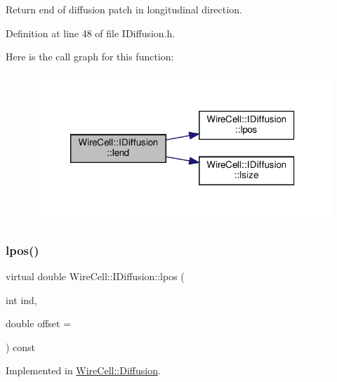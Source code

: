 Return end of diffusion patch in longitudinal direction. 



Definition at line 48 of file I\+Diffusion.\+h.

Here is the call graph for this function\+:
\nopagebreak
\begin{figure}[H]
\begin{center}
\leavevmode
\includegraphics[width=320pt]{class_wire_cell_1_1_i_diffusion_a1016b2629bf19ceb69815200d5f1480f_cgraph}
\end{center}
\end{figure}
\mbox{\label{class_wire_cell_1_1_i_diffusion_a6e85228ca6d4b6848bb8f80a1018a2aa}} 
\subsubsection{\texorpdfstring{lpos()}{lpos()}}
{\footnotesize\ttfamily virtual double Wire\+Cell\+::\+I\+Diffusion\+::lpos (\begin{DoxyParamCaption}\item[{int}]{ind,  }\item[{double}]{offset = {} }\end{DoxyParamCaption}) const\hspace{0.3cm}{\ttfamily [pure virtual]}}



Implemented in \hyperlink{class_wire_cell_1_1_diffusion_a406a933c156b668dc25555e4aa851567}{Wire\+Cell\+::\+Diffusion}.

